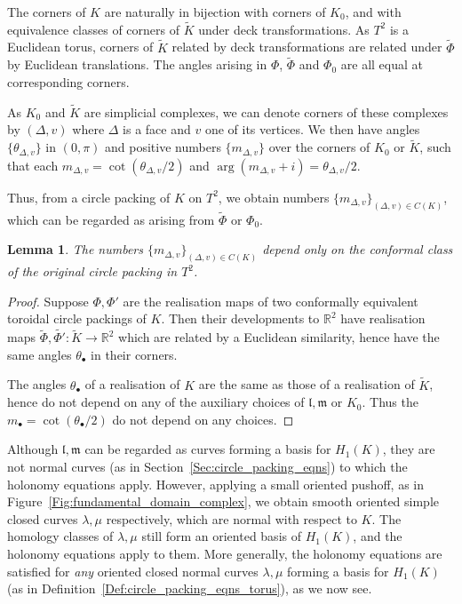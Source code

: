 \documentclass[12pt]{amsart}
\numberwithin{equation}{section}
\newtheorem{lem}[equation]{Lemma}
\theoremstyle{named}
\newcommand{\refsec}[1]{Section~\ref{Sec:#1}}
\newcommand{\refdef}[1]{Definition~\ref{Def:#1}}
\newcommand{\reffig}[1]{Figure~\ref{Fig:#1}}
\newcommand{\R}{\mathbb{R}}
\newcommand{\To}{\longrightarrow}
\begin{document}
The corners of $K$ are naturally in bijection with corners of $K_0$, and with equivalence classes of corners of $\widetilde{K}$ under deck transformations. As $T^2$ is a Euclidean torus, corners of $\widetilde{K}$ related by deck transformations are related under $\widetilde{\Phi}$ by Euclidean translations. The angles arising in $\Phi$, $\widetilde{\Phi}$ and $\Phi_0$ are all equal at corresponding corners. 

As $K_0$ and $\widetilde{K}$ are simplicial complexes, we can denote corners of these complexes by $(\Delta, v)$ where $\Delta$ is a face and $v$ one of its vertices. We then have angles $\{\theta_{\Delta,v}\}$ in $(0, \pi)$ and positive numbers $\{m_{\Delta,v}\}$ over the corners of $K_0$ or $\widetilde{K}$, such that each $m_{\Delta,v} = \cot ( \theta_{\Delta,v}/2)$ and $\arg(m_{\Delta,v}+i) = \theta_{\Delta,v}/2$.

Thus, from a circle packing of $K$ on $T^2$, we obtain numbers $\{m_{\Delta,v}\}_{(\Delta, v) \in C(K)}$, which can be regarded as arising from $\widetilde{\Phi}$ or $\Phi_0$. 


\begin{lem}
The numbers $\{m_{\Delta,v}\}_{(\Delta,v) \in C(K)}$ depend only on the conformal class of the original circle packing in $T^2$.
\end{lem}

\begin{proof}
Suppose $\Phi, \Phi'$ are the realisation maps of two conformally equivalent toroidal circle packings of $K$. Then their developments to $\R^2$ have realisation maps $\widetilde{\Phi}, \widetilde{\Phi'} \colon \widetilde{K} \To \R^2$ which are related by a Euclidean similarity, hence have the same angles $\theta_\bullet$ in their corners.

The angles $\theta_\bullet$ of a realisation of $K$ are the same as those of a realisation of $\widetilde{K}$, hence do not depend on any of the auxiliary choices of $\mathfrak{l}, \mathfrak{m}$ or $K_0$. Thus the $m_\bullet = \cot (\theta_\bullet/2)$ do not depend on any choices.
\end{proof}

Although $\mathfrak{l}, \mathfrak{m}$ can be regarded as curves forming a basis for $H_1 (K)$, they are not normal curves (as in \refsec{circle_packing_eqns}) to which the holonomy equations apply. However, applying a small oriented pushoff, as in \reffig{fundamental_domain_complex}, we obtain smooth oriented simple closed curves $\lambda, \mu$ respectively, which are normal with respect to $K$. The homology classes of $\lambda, \mu$ still form an oriented basis of $H_1 (K)$, and the holonomy equations apply to them. More generally, the holonomy equations are satisfied for \emph{any} oriented closed normal curves $\lambda, \mu$ forming a basis for $H_1 (K)$ (as in \refdef{circle_packing_eqns_torus}), as we now see. 
\end{document}

